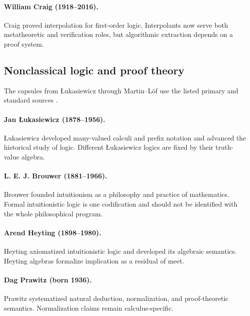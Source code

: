 \paragraph{William Craig (1918--2016).}
Craig proved interpolation for first-order logic. Interpolants now serve both
metatheoretic and verification roles, but algorithmic extraction depends on a
proof system.

\subsection*{Nonclassical logic and proof theory}
The capsules from \L{}ukasiewicz through Martin--L\"of use the listed primary
and standard sources \cite{LukasiewiczTarski1930,Brouwer1908,Heyting1930,
Prawitz1965,Girard1972,GirardLafontTaylor1989,Girard1987,MartinLof1984}.

\paragraph{Jan \L{}ukasiewicz (1878--1956).}
\L{}ukasiewicz developed many-valued calculi and prefix notation and advanced
the historical study of logic. Different \L{}ukasiewicz logics are fixed by
their truth-value algebra.

\paragraph{L. E. J. Brouwer (1881--1966).}
Brouwer founded intuitionism as a philosophy and practice of mathematics.
Formal intuitionistic logic is one codification and should not be identified
with the whole philosophical program.

\paragraph{Arend Heyting (1898--1980).}
Heyting axiomatized intuitionistic logic and developed its algebraic semantics.
Heyting algebras formalize implication as a residual of meet.

\paragraph{Dag Prawitz (born 1936).}
Prawitz systematized natural deduction, normalization, and proof-theoretic
semantics. Normalization claims remain calculus-specific.

